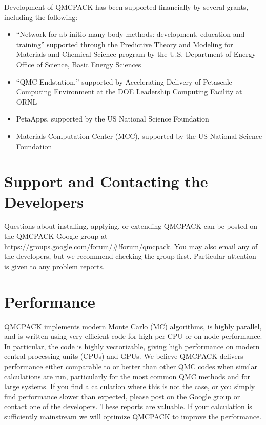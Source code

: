 Development of QMCPACK has been supported financially by
several grants, including the following:

\begin{itemize}
\item ``Network for ab initio many-body methods: development, education
  and training'' supported through the Predictive
  Theory and Modeling for Materials and Chemical Science program by
  the U.S. Department of Energy Office of Science, Basic Energy
  Sciences
\item ``QMC Endstation,'' supported by Accelerating Delivery of Petascale
  Computing Environment at the DOE Leadership Computing Facility at
  ORNL
\item PetaApps, supported by the US National Science
  Foundation
\item Materials Computation Center (MCC), supported by the
  US National Science Foundation
\end{itemize}


\section{Support and Contacting the Developers}
\label{sec:support}

Questions about installing, applying, or extending QMCPACK can be
posted on the QMCPACK Google group at
\url{https://groups.google.com/forum/#!forum/qmcpack}. You may also
email any of the developers, but we recommend checking the group
first. Particular attention is given to any problem reports.

\section{Performance}
\label{sec:performance}

QMCPACK implements modern Monte Carlo (MC) algorithms, is highly parallel,
and is written using very efficient code for high per-CPU or on-node performance. In particular, the code is highly vectorizable,
giving high performance on modern central processing units (CPUs) and GPUs. We believe QMCPACK
delivers performance either comparable to or better than other QMC
codes when similar calculations are run, particularly for the most
common QMC methods and for large systems. If you find a calculation where this is not the
case, or you simply find performance slower than expected, please post on the Google
group or contact one of the developers. These reports are valuable. If your calculation is
sufficiently mainstream we will optimize QMCPACK to improve
the performance.

